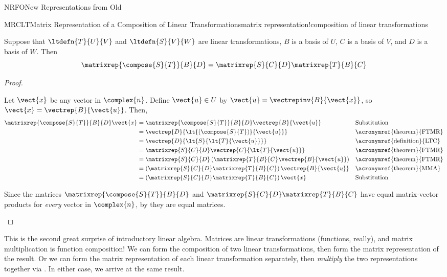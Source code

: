 \begin{subsect}{NRFO}{New Representations from Old}
%
\begin{theorem}{MRCLT}{Matrix Representation of a Composition of Linear Transformations}{matrix representation!composition of linear transformations}
\begin{para}Suppose that $\ltdefn{T}{U}{V}$ and $\ltdefn{S}{V}{W}$ are linear transformations, $B$ is a basis of $U$, $C$ is a basis of $V$, and $D$ is a basis of $W$.  Then
%
\begin{equation*}
\matrixrep{\compose{S}{T}}{B}{D}=\matrixrep{S}{C}{D}\matrixrep{T}{B}{C}
\end{equation*}
\end{para}
%
\end{theorem}
%
\begin{proof}
\begin{para}Let $\vect{x}$ be any vector in $\complex{n}$.  Define $\vect{u}\in U$ by $\vect{u}=\vectrepinv{B}{\vect{x}}$, so $\vect{x}=\vectrep{B}{\vect{u}}$.  Then,
%
\begin{align*}
\matrixrep{\compose{S}{T}}{B}{D}\vect{x}&=
\matrixrep{\compose{S}{T}}{B}{D}\vectrep{B}{\vect{u}}&&\text{Substitution}\\
&=\vectrep{D}{\lt{\left(\compose{S}{T}\right)}{\vect{u}}}&&\text{\acronymref{theorem}{FTMR}}\\
&=\vectrep{D}{\lt{S}{\lt{T}{\vect{u}}}}&&\text{\acronymref{definition}{LTC}}\\
&=\matrixrep{S}{C}{D}\vectrep{C}{\lt{T}{\vect{u}}}&&\text{\acronymref{theorem}{FTMR}}\\
&=\matrixrep{S}{C}{D}\left(\matrixrep{T}{B}{C}\vectrep{B}{\vect{u}}\right)&&\text{\acronymref{theorem}{FTMR}}\\
&=\left(\matrixrep{S}{C}{D}\matrixrep{T}{B}{C}\right)\vectrep{B}{\vect{u}}&&\text{\acronymref{theorem}{MMA}}\\
&=\left(\matrixrep{S}{C}{D}\matrixrep{T}{B}{C}\right)\vect{x}&&\text{Substitution}
\end{align*}
\end{para}
%
\begin{para}Since the matrices $\matrixrep{\compose{S}{T}}{B}{D}$ and $\matrixrep{S}{C}{D}\matrixrep{T}{B}{C}$ have equal matrix-vector products for {\em every} vector in $\complex{n}$, by  they are equal matrices.\end{para}
%
\end{proof}
%
\begin{para}This is the second great surprise of introductory linear algebra.  Matrices are linear transformations (functions, really), and matrix multiplication is function composition!  We can form the composition of two linear transformations, then form the matrix representation of the result.  Or we can form the matrix representation of each linear transformation separately, then {\em multiply} the two representations together via .  In either case, we arrive at the same result.\end{para}

\end{subsect}
